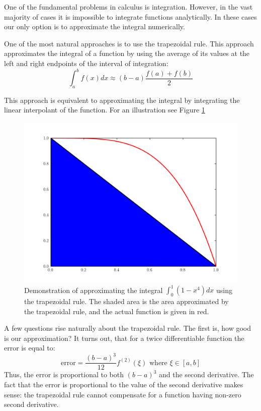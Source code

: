 

One of the fundamental problems in calculus is integration.
However, in the vast majority of cases it is impossible to integrate functions analytically.
In these cases our only option is to approximate the integral numerically.

One of the most natural approaches is to use the trapezoidal rule.
This approach approximates the integral of a function by using the average of its values at the left and right endpoints of the interval of integration:
\[
\int_a^b f(x) dx \approx (b-a)\frac{f(a) + f(b)}{2}
\]

This approach is equivalent to approximating the integral by integrating the linear interpolant of the function.
For an illustration see Figure \ref{Fig:Trapezoidal}

\begin{figure}
\begin{center}
\includegraphics[width=\textwidth]{Trapezoid.pdf}
\caption{Demonstration of approximating the integral $\int_0^1 (1-x^4)dx$ using the trapezoidal rule.
The shaded area is the area approximated by the trapezoidal rule, and the actual function is given in red.}
\label{Fig:Trapezoidal}
\end{center}
\end{figure}

A few questions rise naturally about the trapezoidal rule.
The first is, how good is our approximation?
It turns out, that for a twice differentiable function the error is equal to:
\[
\mbox{error} = \frac{(b-a)^3}{12}f^{(2)}(\xi) \mbox{ where } \xi \in [a,b]
\]
Thus, the error is proportional to both $(b-a)^3$ and the second derivative.
The fact that the error is proportional to the value of the second derivative makes sense: the trapezoidal rule cannot compensate for a function having non-zero second derivative.

